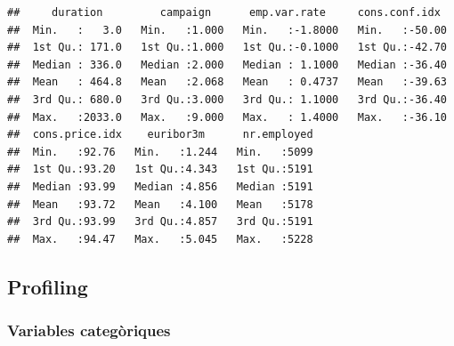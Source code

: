 \documentclass[
]{article}
\newenvironment{Shaded}{\begin{snugshade}}{\end{snugshade}}
\newcommand{\AttributeTok}[1]{\textcolor[rgb]{0.77,0.63,0.00}{#1}}
\newcommand{\CommentTok}[1]{\textcolor[rgb]{0.56,0.35,0.01}{\textit{#1}}}
\newcommand{\FloatTok}[1]{\textcolor[rgb]{0.00,0.00,0.81}{#1}}
\newcommand{\FunctionTok}[1]{\textcolor[rgb]{0.00,0.00,0.00}{#1}}
\newcommand{\NormalTok}[1]{#1}
\newcommand{\OtherTok}[1]{\textcolor[rgb]{0.56,0.35,0.01}{#1}}
\newcommand{\SpecialCharTok}[1]{\textcolor[rgb]{0.00,0.00,0.00}{#1}}
\newcommand{\StringTok}[1]{\textcolor[rgb]{0.31,0.60,0.02}{#1}}
\begin{document}
\begin{verbatim}
##     duration         campaign      emp.var.rate     cons.conf.idx   
##  Min.   :   3.0   Min.   :1.000   Min.   :-1.8000   Min.   :-50.00  
##  1st Qu.: 171.0   1st Qu.:1.000   1st Qu.:-0.1000   1st Qu.:-42.70  
##  Median : 336.0   Median :2.000   Median : 1.1000   Median :-36.40  
##  Mean   : 464.8   Mean   :2.068   Mean   : 0.4737   Mean   :-39.63  
##  3rd Qu.: 680.0   3rd Qu.:3.000   3rd Qu.: 1.1000   3rd Qu.:-36.40  
##  Max.   :2033.0   Max.   :9.000   Max.   : 1.4000   Max.   :-36.10  
##  cons.price.idx    euribor3m      nr.employed  
##  Min.   :92.76   Min.   :1.244   Min.   :5099  
##  1st Qu.:93.20   1st Qu.:4.343   1st Qu.:5191  
##  Median :93.99   Median :4.856   Median :5191  
##  Mean   :93.72   Mean   :4.100   Mean   :5178  
##  3rd Qu.:93.99   3rd Qu.:4.857   3rd Qu.:5191  
##  Max.   :94.47   Max.   :5.045   Max.   :5228
\end{verbatim}

\begin{Shaded}
\end{Shaded}

\hypertarget{profiling}{%
\subsection{Profiling}\label{profiling}}

\hypertarget{variables-categuxf2riques-1}{%
\subsubsection{Variables
categòriques}\label{variables-categuxf2riques-1}}

\begin{Shaded}
\end{Shaded}
\end{document}
